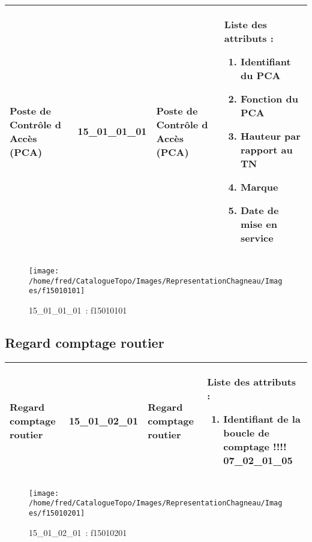 \documentclass[12pt,titlepage]{book}
\begin{document}
\renewcommand{\arraystretch}{1.2}
\begin{supertabular}{|p{10cm}|c|p{13cm}|p{12cm}|}
 Poste de Contrôle d Accès (PCA) & 15\_01\_01\_01 & Poste de Contrôle d Accès (PCA) & Liste des attributs :
\begin{enumerate}
  \item Identifiant du PCA  \item Fonction du PCA  \item Hauteur par rapport au TN  \item Marque  \item Date de mise en service\end{enumerate}
\\
\hline
\end{supertabular}
\begin{figure}[h!]
  \hfill         %
  \begin{minipage}[t]{3cm}
    \begin{center}
      \texttt{[image: /home/fred/CatalogueTopo/Images/RepresentationChagneau/Images/f15010101]}
      \caption[~15\_01\_01\_01]{\small{15\_01\_01\_01~:} \tiny{f15010101}}\label{f15010101}
    \end{center}
  \end{minipage}
\end{figure}


\subsection{Regard comptage routier}
\noindent
\vspace{\baselineskip}

\renewcommand{\arraystretch}{1.2}
\begin{supertabular}{|p{10cm}|c|p{13cm}|p{12cm}|}
 Regard comptage routier & 15\_01\_02\_01 & Regard comptage routier & Liste des attributs :
\begin{enumerate}
  \item Identifiant de la boucle de comptage !!!!  07\_02\_01\_05\end{enumerate}
\\
\hline
\end{supertabular}
\begin{figure}[h!]
  \hfill         %
  \begin{minipage}[t]{3cm}
    \begin{center}
      \texttt{[image: /home/fred/CatalogueTopo/Images/RepresentationChagneau/Images/f15010201]}
      \caption[~15\_01\_02\_01]{\small{15\_01\_02\_01~:} \tiny{f15010201}}\label{f15010201}
    \end{center}
  \end{minipage}
\end{figure}
\end{document}

